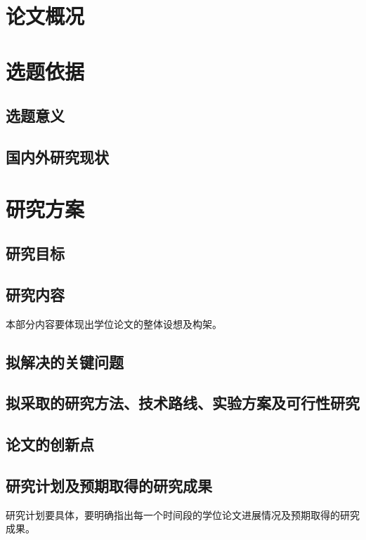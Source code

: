 \documentclass{xdupgtp}
\begin{document}
\section{论文概况}
\begin{zwzy}
\end{zwzy}

\section{选题依据}
\begin{xtyj}
\subsection{选题意义}
\subsection{国内外研究现状}
\end{xtyj}

\section{研究方案}
\begin{yjfa}
\subsection{研究目标}
\subsection{研究内容}
本部分内容要体现出学位论文的整体设想及构架。
\subsection{拟解决的关键问题}
\subsection{拟采取的研究方法、技术路线、实验方案及可行性研究}
\subsection{论文的创新点} %
\subsection{研究计划及预期取得的研究成果}
研究计划要具体，要明确指出每一个时间段的学位论文进展情况及预期取得的研究成果。
\end{yjfa}
\end{document}
